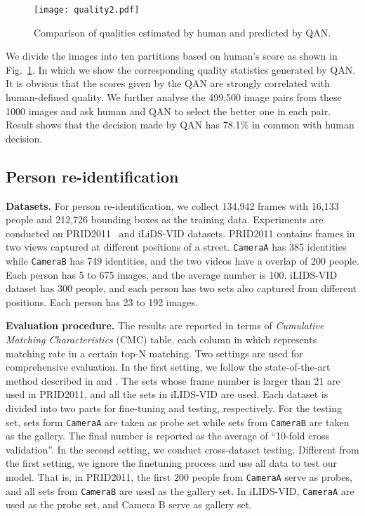 \documentclass[10pt,twocolumn,letterpaper]{article}
\begin{document}
\begin{figure}[!htb]
\centering
  \texttt{[image: quality2.pdf]}
  \caption{Comparison of qualities estimated by human and predicted by QAN.}
  \label{fig:quality}
\endminipage\hfill

\end{figure}

We divide the images into ten partitions based on human's score as shown in Fig.~\ref{fig:quality}. In which we show the corresponding quality statistics generated by QAN. It is obvious that the scores given by the QAN are strongly correlated with human-defined quality. We further analyse the 499,500 image pairs from these 1000 images and ask human and QAN to select the better one in each pair.  Result shows that the decision made by QAN has 78.1\% in common with human decision.


















\subsection{Person re-identification}
\textbf{Datasets.} For person re-identification, we collect 134,942 frames with 16,133 people and 212,726 bounding boxes as the training data. Experiments are conducted on PRID2011~\cite{hirzer11a} and iLiDS-VID\cite{wang2014person} datasets. PRID2011 contains frames in two views captured at different positions of a street. \texttt{CameraA} has 385 identities while \texttt{CameraB} has 749 identities, and the two videos have a overlap of 200 people. Each person has 5 to 675 images, and the average number is 100. iLIDS-VID dataset has 300 people, and each person has two sets also captured from different positions. Each person has 23 to 192 images.

\textbf{Evaluation procedure.}
The results are reported in terms of \emph{Cumulative Matching Characteristics} (CMC) table, each column in which represents matching rate in a certain top-N matching.
Two settings are used for comprehensive evaluation. In the first setting, we follow the state-of-the-art method described in \cite{you2016top} and \cite{wang2016person}. The sets whose frame number is larger than 21 are used in PRID2011, and all the sets in iLIDS-VID are used. Each dataset is divided into two parts for fine-tuning and testing, respectively. For the testing set, sets form \texttt{CameraA} are taken as probe set while sets from \texttt{CameraB} are taken as the gallery. The final number is reported as the average of ``10-fold cross validation''. In the second setting, we conduct cross-dataset  testing. Different from the first setting, we ignore the finetuning process and use all data to test our model. That is, in PRID2011, the first 200 people from \texttt{CameraA} serve as probes, and all sets from \texttt{CameraB} are used as the gallery set. In iLIDS-VID,  \texttt{CameraA} are used as the probe set, and Camera B serve as gallery set.
\end{document}
